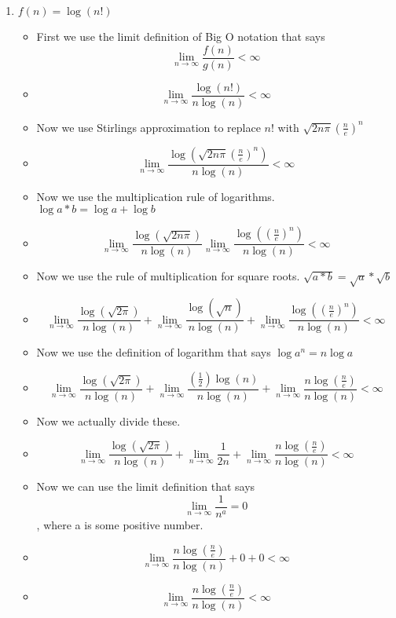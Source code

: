\documentclass{article}
\begin{document}
\begin{enumerate}
\begin{itemize}
  \end{itemize}
\item $f(n) = \log{(n!)}$
  \begin{itemize}
  \item First we use the limit definition of Big O notation that says $$\lim_{n \to \infty} \frac{f(n)}{g(n)} < \infty$$
  \item {\Large $$\lim_{n \to \infty} \frac{\log{(n!)}}{n\log{(n)}} <\infty$$}
  \item Now we use Stirlings approximation to replace $n!$ with $\sqrt{2n\pi}\left(\frac{n}{e}\right)^{n}$
  \item {\Large $$\lim_{n \to \infty} \frac{\log{(\sqrt{2n\pi}\left(\frac{n}{e}\right)^{n})}}{n\log{(n)}} <\infty$$}
  \item Now we use the multiplication rule of logarithms. $\log{a*b} = \log{a} + \log{b}$
  \item {\Large $$\lim_{n \to \infty} \frac{\log{(\sqrt{2n\pi})}}{n\log{(n)}} \lim_{n \to \infty} \frac{\log{(\left(\frac{n}{e}\right)^{n})}}{n\log{(n)}} <\infty$$}
  \item Now we use the rule of multiplication for square roots. $\sqrt{a*b} = \sqrt{a}*\sqrt{b}$
  \item {\Large $$\lim_{n \to \infty} \frac{\log{(\sqrt{2\pi})}}{n\log{(n)}} + \lim_{n \to \infty} \frac{\log{(\sqrt{n})}}{n\log{(n)}} + \lim_{n \to \infty} \frac{\log{(\left(\frac{n}{e}\right)^{n})}}{n\log{(n)}} <\infty$$}
  \item Now we use the definition of logarithm that says $\log{a^{n}} = n\log{a}$
  \item {\Large $$\lim_{n \to \infty} \frac{\log{(\sqrt{2\pi})}}{n\log{(n)}} + \lim_{n \to \infty} \frac{(\frac{1}{2})\log{(n)}}{n\log{(n)}} + \lim_{n \to \infty} \frac{n\log{(\frac{n}{e})}}{n\log{(n)}} <\infty$$}
  \item Now we actually divide these.
  \item {\Large $$\lim_{n \to \infty} \frac{\log{(\sqrt{2\pi})}}{n\log{(n)}} + \lim_{n \to \infty} \frac{1}{2n} + \lim_{n \to \infty} \frac{n\log{(\frac{n}{e})}}{n\log{(n)}} <\infty$$}
  \item Now we can use the limit definition that says $$\lim_{n \to \infty} \frac{1}{n^{a}} = 0$$, where a is some positive number.
  \item {\Large $$\lim_{n \to \infty} \frac{n\log{(\frac{n}{e})}}{n\log{(n)}} + 0 + 0 <\infty$$}
  \item {\Large $$\lim_{n \to \infty} \frac{n\log{(\frac{n}{e})}}{n\log{(n)}} <\infty$$}

\end{itemize}
\end{enumerate}
\end{document}
